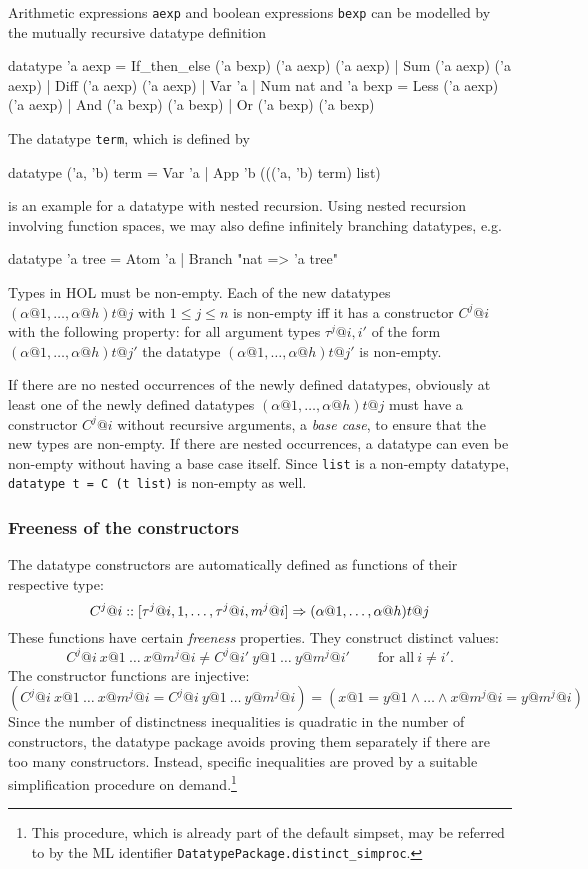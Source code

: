 Arithmetic expressions \texttt{aexp} and boolean expressions \texttt{bexp} can be modelled
by the mutually recursive datatype definition
\begin{ttbox}
datatype 'a aexp = If_then_else ('a bexp) ('a aexp) ('a aexp)
                 | Sum ('a aexp) ('a aexp)
                 | Diff ('a aexp) ('a aexp)
                 | Var 'a
                 | Num nat
and      'a bexp = Less ('a aexp) ('a aexp)
                 | And ('a bexp) ('a bexp)
                 | Or ('a bexp) ('a bexp)
\end{ttbox}
The datatype \texttt{term}, which is defined by
\begin{ttbox}
datatype ('a, 'b) term = Var 'a
                       | App 'b ((('a, 'b) term) list)
\end{ttbox}
is an example for a datatype with nested recursion. Using nested recursion
involving function spaces, we may also define infinitely branching datatypes, e.g.
\begin{ttbox}
datatype 'a tree = Atom 'a | Branch "nat => 'a tree"
\end{ttbox}

\medskip

Types in HOL must be non-empty. Each of the new datatypes
$(\alpha@1,\ldots,\alpha@h)t@j$ with $1 \le j \le n$ is non-empty iff it has a
constructor $C^j@i$ with the following property: for all argument types
$\tau^j@{i,i'}$ of the form $(\alpha@1,\ldots,\alpha@h)t@{j'}$ the datatype
$(\alpha@1,\ldots,\alpha@h)t@{j'}$ is non-empty.

If there are no nested occurrences of the newly defined datatypes, obviously
at least one of the newly defined datatypes $(\alpha@1,\ldots,\alpha@h)t@j$
must have a constructor $C^j@i$ without recursive arguments, a \emph{base
  case}, to ensure that the new types are non-empty. If there are nested
occurrences, a datatype can even be non-empty without having a base case
itself. Since \texttt{list} is a non-empty datatype, \texttt{datatype t = C (t
  list)} is non-empty as well.


\subsubsection{Freeness of the constructors}

The datatype constructors are automatically defined as functions of their
respective type:
\[ C^j@i :: [\tau^j@{i,1},\dots,\tau^j@{i,m^j@i}] \To (\alpha@1,\dots,\alpha@h)t@j \]
These functions have certain {\em freeness} properties.  They construct
distinct values:
\[
C^j@i~x@1~\dots~x@{m^j@i} \neq C^j@{i'}~y@1~\dots~y@{m^j@{i'}} \qquad
\mbox{for all}~ i \neq i'.
\]
The constructor functions are injective:
\[
(C^j@i~x@1~\dots~x@{m^j@i} = C^j@i~y@1~\dots~y@{m^j@i}) =
(x@1 = y@1 \land \dots \land x@{m^j@i} = y@{m^j@i})
\]
Since the number of distinctness inequalities is quadratic in the number of
constructors, the datatype package avoids proving them separately if there are
too many constructors. Instead, specific inequalities are proved by a suitable
simplification procedure on demand.\footnote{This procedure, which is already part
of the default simpset, may be referred to by the ML identifier
\texttt{DatatypePackage.distinct_simproc}.}

